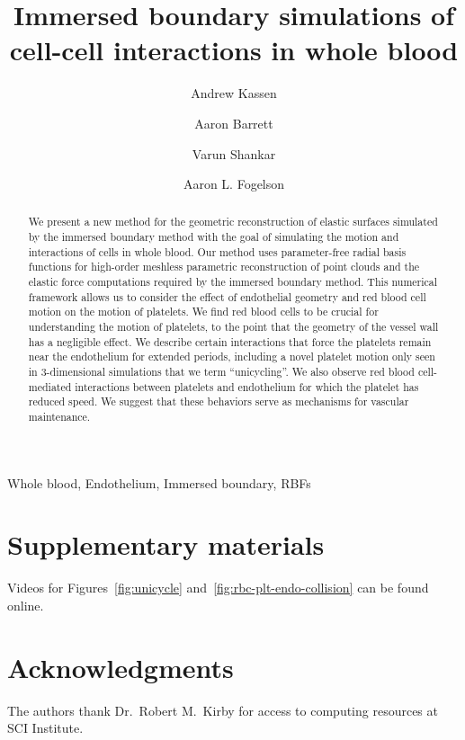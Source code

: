 \documentclass[1p,preprint,fleqn,number,sort&compress,times]{elsarticle}
\begin{document}
\begin{frontmatter}

\title{Immersed boundary simulations of cell-cell interactions in whole blood}

\author[1]{Andrew Kassen}  
\author[1]{Aaron Barrett}               
\author[2]{Varun Shankar}               
\author[1]{Aaron L. Fogelson}  

\address[1]{Department of Mathematics, University of Utah, Salt Lake City, UT 84112, USA}
\address[2]{School of Computing, University of Utah, Salt Lake City, UT 84112, USA}
\address[3]{Department of Bioengineering, University of Utah, Salt Lake City, UT 84112, USA}


\begin{abstract}
We present a new method for the geometric reconstruction of elastic surfaces simulated by the immersed boundary method with the goal of simulating the motion and interactions of cells in whole blood. Our method uses parameter-free radial basis functions for high-order meshless parametric reconstruction of point clouds and the elastic force computations required by the immersed boundary method. This numerical framework allows us to consider the effect of endothelial geometry and red blood cell motion on the motion of platelets. We find red blood cells to be crucial for understanding the motion of platelets, to the point that the geometry of the vessel wall has a negligible effect. We describe certain interactions that force the platelets remain near the endothelium for extended periods, including a novel platelet motion only seen in 3-dimensional simulations that we term ``unicycling''. We also observe red blood cell-mediated interactions between platelets and endothelium for which the platelet has reduced speed. We suggest that these behaviors serve as mechanisms for vascular maintenance.
\end{abstract}

\begin{keyword}
    Whole blood,
    Endothelium,
    Immersed boundary,
    RBFs
\end{keyword}

\end{frontmatter}





\appendix
\makeatletter
\gdef\thesubsection{\@Alph\c@section.\the\value{subsection}}%
\makeatother


\section{Supplementary materials}\label{sec:supp}
Videos for Figures~\ref{fig:unicycle} and~\ref{fig:rbc-plt-endo-collision} can be found
online.

\section*{Acknowledgments}
The authors thank Dr.\ Robert M.\ Kirby for access to computing resources at SCI
Institute.


\end{document}
